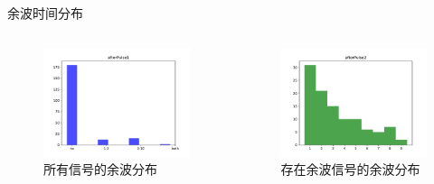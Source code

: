 \documentclass[10pt]{beamer}
\begin{document}
\begin{frame}[label={sec:org8797c6e}]{余波时间分布}
\begin{columns}
\begin{column}{0.5\columnwidth}
\begin{figure}[htbp]
\centering
\includegraphics[width=1.0\textwidth]{../../img/afterPulse01.pdf}
\caption{所有信号的余波分布}
\end{figure}
\end{column}

\begin{column}{0.5\columnwidth}
\begin{figure}[htbp]
\centering
\includegraphics[width=1.0\textwidth]{../../img/afterPulse02.pdf}
\caption{存在余波信号的余波分布}
\end{figure}
\end{column}
\end{columns}
\end{frame}
\end{document}
